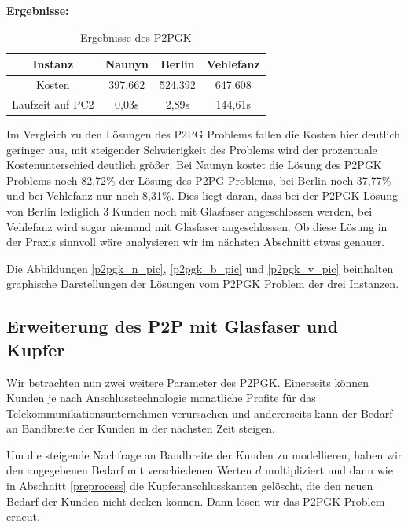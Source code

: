 \documentclass[11pt,a4paper]{article}
\theoremstyle{my_th_style1}
\begin{document}
\textbf{Ergebnisse:}
\begin{table}[h]
	\centering
	\begin{tabular}{c|c|c|c}
		Instanz & Naunyn & Berlin & Vehlefanz \\	
		\hline
		Kosten & 397.662 & 524.392 & 647.608 \\
		Laufzeit auf PC2 & 0,03s & 2,89s & 144,61s \\
	\end{tabular}
	\label{P2PGK}
	\caption{Ergebnisse des P2PGK} 
\end{table}

Im Vergleich zu den L\"osungen des P2PG Problems fallen die Kosten hier deutlich geringer aus, mit steigender Schwierigkeit des Problems wird der prozentuale Kostenunterschied deutlich gr\"oßer.
Bei Naunyn kostet die L\"osung des P2PGK Problems noch 82,72\% der L\"osung des P2PG Problems, bei Berlin noch 37,77\% und bei Vehlefanz nur noch 8,31\%.
Dies liegt daran, dass bei der P2PGK L\"osung von Berlin lediglich 3 Kunden noch mit Glasfaser angeschlossen werden, bei Vehlefanz wird sogar niemand mit Glasfaser angeschlossen.
Ob diese L\"osung in der Praxis sinnvoll w\"are analysieren wir im n\"achsten Abschnitt etwas genauer.

Die Abbildungen \eqref{p2pgk_n_pic}, \eqref{p2pgk_b_pic} und \eqref{p2pgk_v_pic} beinhalten graphische Darstellungen der L\"osungen vom P2PGK Problem der drei Instanzen.

\subsection{Erweiterung des P2P mit Glasfaser und Kupfer}
\label{Erweiterung des P2PGK}

Wir betrachten nun zwei weitere Parameter des P2PGK.
Einerseits k\"onnen Kunden je nach Anschlusstechnologie monatliche Profite f\"ur das Telekommunikationsunternehmen verursachen und andererseits kann der Bedarf an Bandbreite der Kunden in der n\"achsten Zeit steigen.

Um die steigende Nachfrage an Bandbreite der Kunden zu modellieren, haben wir den angegebenen Bedarf mit verschiedenen Werten $d$ multipliziert und dann wie in Abschnitt \ref{preprocess} die Kupferanschlusskanten gelöscht, die den neuen Bedarf der Kunden nicht decken können.
Dann lösen wir das P2PGK Problem erneut. 
\end{document}
